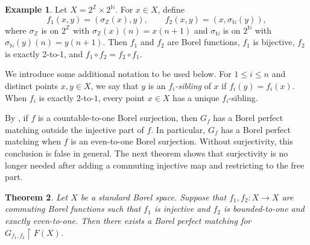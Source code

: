 \documentclass[11pt, reqno, a4paper]{amsart}
\newtheorem{theorem}{Theorem}[section]
\theoremstyle{definition}
\newtheorem{example}[theorem]{Example}
\theoremstyle{plain}
\begin{document}
\begin{example}
Let $X=2^\mathbb{Z}\times2^\mathbb{N}$. For $x\in X$, define
$$
f_1(x,y)=(\sigma_{\mathbb{Z}}(x),y),
\qquad
f_2(x,y)=(x,\sigma_{\mathbb{N}}(y)),
$$
where $\sigma_\mathbb{Z}$ is on $2^\mathbb{Z}$ with  $\sigma_{\mathbb{Z}}(x)(n)=x(n+1)$ and $\sigma_\mathbb{N}$ is on $2^\mathbb{N}$ with $\sigma_{\mathbb{N}}(y)(n)=y(n+1)$.
Then $f_1$ and $f_2$ are Borel functions, $f_1$ is bijective, $f_2$ is exactly 2-to-1, and
$f_1\circ f_2=f_2\circ f_1$.
\end{example}

We introduce some additional notation to be used below. For $1\le i\le n$ and distinct points $x,y\in X$, we say that
$y$ is an \emph{$f_i$-sibling} of $x$ if
$f_i(y)=f_i(x)$. When $f_i$ is exactly $2$-to-$1$, every point
$x\in X$ has a unique $f_i$-sibling. 

By \cite[Proposition~2.8]
{ConleyMiller2017MeasurablePerfectMatchings}, if $f$ is a countable-to-one Borel
surjection, then $G_f$ has a Borel perfect matching outside the
injective part of $f$. In particular,
$G_f$ has a Borel perfect matching when $f$ is an even-to-one
Borel surjection. Without surjectivity, this conclusion is false
in general. The next theorem shows that surjectivity is no longer
needed after adding a commuting injective map and restricting to
the free part.

\begin{theorem}
\label{thm:perfect-matching}
Let $X$ be a standard Borel space. Suppose that $f_1,f_2:X\to X$ are commuting Borel functions such that $f_1$ is injective and $f_2$ is bounded-to-one and exactly even-to-one.
Then there exists a Borel perfect matching for $G_{f_1,f_2}\upharpoonright F(X)$.
\end{theorem}
\end{document}
